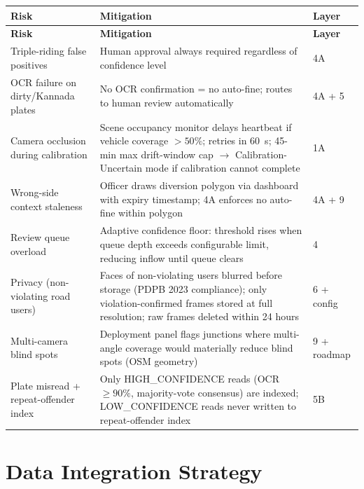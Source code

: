 \documentclass[11pt,a4paper]{article}
\begin{document}
\begin{longtable}{L{3.5cm} L{7cm} C{2.5cm}}
    \toprule
    \color{white}\textbf{Risk} & \color{white}\textbf{Mitigation} & \color{white}\textbf{Layer} \\
    \midrule
    \endfirsthead
    \toprule
    \color{white}\textbf{Risk} & \color{white}\textbf{Mitigation} & \color{white}\textbf{Layer} \\
    \midrule
    \endhead
    \bottomrule
    \endfoot

    Triple-riding false positives & Human approval always required regardless of confidence level & 4A \\
    OCR failure on dirty/Kannada plates & No OCR confirmation = no auto-fine; routes to human review automatically & 4A + 5 \\
    Camera occlusion during calibration & Scene occupancy monitor delays heartbeat if vehicle coverage $> 50\%$; retries in 60~s; 45-min max drift-window cap $\rightarrow$ Calibration-Uncertain mode if calibration cannot complete & 1A \\
    Wrong-side context staleness & Officer draws diversion polygon via dashboard with expiry timestamp; 4A enforces no auto-fine within polygon & 4A + 9 \\
    Review queue overload & Adaptive confidence floor: threshold rises when queue depth exceeds configurable limit, reducing inflow until queue clears & 4 \\
    Privacy (non-violating road users) & Faces of non-violating users blurred before storage (PDPB 2023 compliance); only violation-confirmed frames stored at full resolution; raw frames deleted within 24 hours & 6 + config \\
    Multi-camera blind spots & Deployment panel flags junctions where multi-angle coverage would materially reduce blind spots (OSM geometry) & 9 + roadmap \\
    Plate misread + repeat-offender index & Only HIGH\_CONFIDENCE reads (OCR $\geq 90\%$, majority-vote consensus) are indexed; LOW\_CONFIDENCE reads never written to repeat-offender index & 5B \\
\end{longtable}

\section{Data Integration Strategy}
\end{document}
